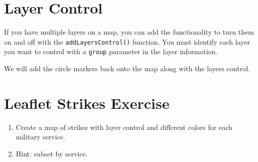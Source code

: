 \documentclass[oneside]{memoir}
\newenvironment{Shaded}{\begin{snugshade}}{\end{snugshade}}
\newcommand{\KeywordTok}[1]{\textcolor[rgb]{0.13,0.29,0.53}{\textbf{#1}}}
\newcommand{\DataTypeTok}[1]{\textcolor[rgb]{0.13,0.29,0.53}{#1}}
\newcommand{\DecValTok}[1]{\textcolor[rgb]{0.00,0.00,0.81}{#1}}
\newcommand{\StringTok}[1]{\textcolor[rgb]{0.31,0.60,0.02}{#1}}
\newcommand{\OperatorTok}[1]{\textcolor[rgb]{0.81,0.36,0.00}{\textbf{#1}}}
\newcommand{\NormalTok}[1]{#1}
\theoremstyle{definition}
\theoremstyle{definition}
\theoremstyle{definition}
\theoremstyle{remark}
\begin{document}
\section{Layer Control}\label{layer-control}

If you have multiple layers on a map, you can add the functionality to
turn them on and off with the \texttt{addLayersControl()} function. You
must identify each layer you want to control with a \texttt{group}
parameter in the layer information.

We will add the circle markers back onto the map along with the layers
control.

\begin{Shaded}
\end{Shaded}

\section{Leaflet Strikes Exercise}\label{leaflet-strikes-exercise}

\begin{enumerate}
\def\labelenumi{\arabic{enumi}.}
\item
  Create a map of strikes with layer control and different colors for
  each military service.
\item
  Hint: subset by service.
\end{enumerate}
\end{document}
